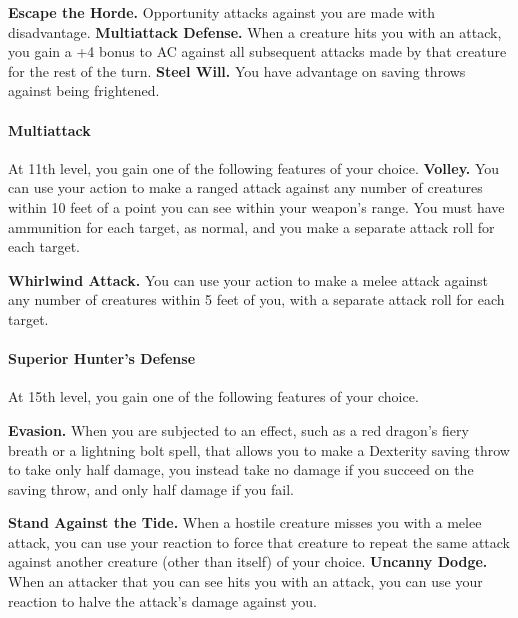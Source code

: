 \documentclass[
]{article}
\begin{document}
\textbf{Escape the Horde.} Opportunity attacks against you are made with
disadvantage. \textbf{Multiattack Defense.} When a creature hits you
with an attack, you gain a +4 bonus to AC against all subsequent attacks
made by that creature for the rest of the turn. \textbf{Steel Will.} You
have advantage on saving throws against being frightened.

\hypertarget{multiattack}{%
\paragraph{Multiattack}\label{multiattack}}

At 11th level, you gain one of the following features of your choice.
\textbf{Volley.} You can use your action to make a ranged attack against
any number of creatures within 10 feet of a point you can see within
your weapon's range. You must have ammunition for each target, as
normal, and you make a separate attack roll for each target.

\textbf{Whirlwind Attack.} You can use your action to make a melee
attack against any number of creatures within 5 feet of you, with a
separate attack roll for each target.

\hypertarget{superior-hunters-defense}{%
\paragraph{Superior Hunter's Defense}\label{superior-hunters-defense}}

At 15th level, you gain one of the following features of your choice.

\textbf{Evasion.} When you are subjected to an effect, such as a red
dragon's fiery breath or a lightning bolt spell, that allows you to make
a Dexterity saving throw to take only half damage, you instead take no
damage if you succeed on the saving throw, and only half damage if you
fail.

\textbf{Stand Against the Tide.} When a hostile creature misses you with
a melee attack, you can use your reaction to force that creature to
repeat the same attack against another creature (other than itself) of
your choice. \textbf{Uncanny Dodge.} When an attacker that you can see
hits you with an attack, you can use your reaction to halve the attack's
damage against you.
\end{document}
